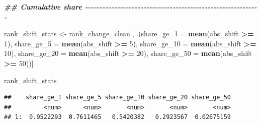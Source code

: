 \documentclass[
  11pt,
]{article}
\newenvironment{Shaded}{\begin{snugshade}}{\end{snugshade}}
\newcommand{\AttributeTok}[1]{\textcolor[rgb]{0.13,0.29,0.53}{#1}}
\newcommand{\DecValTok}[1]{\textcolor[rgb]{0.00,0.00,0.81}{#1}}
\newcommand{\DocumentationTok}[1]{\textcolor[rgb]{0.56,0.35,0.01}{\textbf{\textit{#1}}}}
\newcommand{\FunctionTok}[1]{\textcolor[rgb]{0.13,0.29,0.53}{\textbf{#1}}}
\newcommand{\NormalTok}[1]{#1}
\newcommand{\OtherTok}[1]{\textcolor[rgb]{0.56,0.35,0.01}{#1}}
\newcommand{\SpecialCharTok}[1]{\textcolor[rgb]{0.81,0.36,0.00}{\textbf{#1}}}
\begin{document}
\begin{Shaded}
\begin{Highlighting}[]
\DocumentationTok{\#\# Cumulative share {-}{-}{-}{-}{-}{-}{-}{-}{-}{-}{-}{-}{-}{-}{-}{-}{-}{-}{-}{-}{-}{-}{-}{-}{-}{-}{-}{-}{-}{-}{-}{-}{-}{-}{-}{-}{-}{-}{-}{-}{-}{-}{-}{-}{-}{-}{-}{-}{-}{-}{-}{-}{-}{-}{-}{-}{-}{-}{-}{-}}

\NormalTok{rank\_shift\_stats }\OtherTok{\textless{}{-}}\NormalTok{ rank\_change\_clean[, .(}\AttributeTok{share\_ge\_1  =} \FunctionTok{mean}\NormalTok{(abs\_shift }\SpecialCharTok{\textgreater{}=} \DecValTok{1}\NormalTok{),}
                                          \AttributeTok{share\_ge\_5  =} \FunctionTok{mean}\NormalTok{(abs\_shift }\SpecialCharTok{\textgreater{}=} \DecValTok{5}\NormalTok{),}
                                          \AttributeTok{share\_ge\_10 =} \FunctionTok{mean}\NormalTok{(abs\_shift }\SpecialCharTok{\textgreater{}=} \DecValTok{10}\NormalTok{), }
                                          \AttributeTok{share\_ge\_20 =} \FunctionTok{mean}\NormalTok{(abs\_shift }\SpecialCharTok{\textgreater{}=} \DecValTok{20}\NormalTok{), }
                                          \AttributeTok{share\_ge\_50 =} \FunctionTok{mean}\NormalTok{(abs\_shift }\SpecialCharTok{\textgreater{}=} \DecValTok{50}\NormalTok{))]}

\NormalTok{rank\_shift\_stats}
\end{Highlighting}
\end{Shaded}

\begin{verbatim}
##    share_ge_1 share_ge_5 share_ge_10 share_ge_20 share_ge_50
##         <num>      <num>       <num>       <num>       <num>
## 1:  0.9522293  0.7611465   0.5420382   0.2923567  0.02675159
\end{verbatim}
\end{document}
